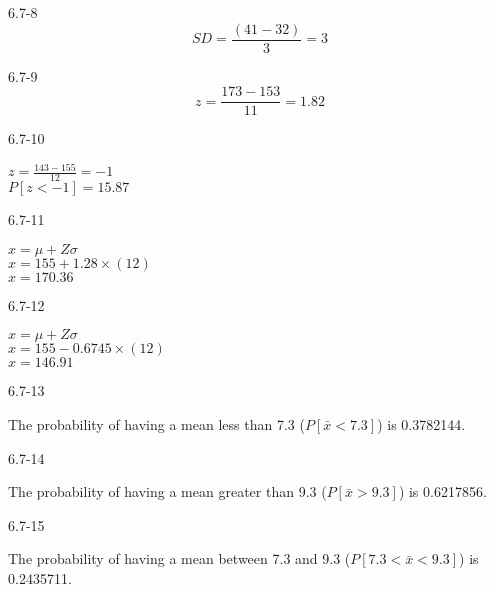 \begin{exsol@solution}{6.7-8}
	  \begin{equation}
	    SD = \frac{(41 - 32)}{3} = 3
	  \end{equation}
\end{exsol@solution}
\begin{exsol@solution}{6.7-9}
	  \begin{equation}
	    z = \frac{173 - 153}{11} = 1.82
	  \end{equation}
\end{exsol@solution}
\begin{exsol@solution}{6.7-10}

	    $z = \frac{143 - 155}{12} = -1$ \\
	    $P[z < -1] = 15.87$

\end{exsol@solution}
\begin{exsol@solution}{6.7-11}

	    $x = \mu + Z \sigma$ \\
	    $x = 155 + 1.28 \times (12) $ \\
	    $x = 170.36$

\end{exsol@solution}
\begin{exsol@solution}{6.7-12}

	    $x = \mu + Z \sigma$ \\
	    $x = 155 - 0.6745 \times (12) $ \\
	    $x = 146.91$

\end{exsol@solution}
\begin{exsol@solution}{6.7-13}



    The probability of having a mean less than 7.3 ($P[ \bar{x} < 7.3 ]$) is 0.3782144.

\end{exsol@solution}
\begin{exsol@solution}{6.7-14}



    The probability of having a mean greater than 9.3 ($P[ \bar{x} > 9.3 ]$) is 0.6217856.

\end{exsol@solution}
\begin{exsol@solution}{6.7-15}



    The probability of having a mean between 7.3 and  9.3 ($P[ 7.3 < \bar{x} < 9.3 ]$) is 0.2435711.

\end{exsol@solution}
